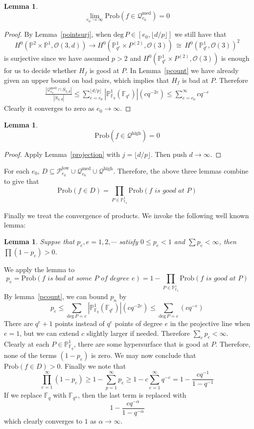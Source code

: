 \documentclass[12pt]{article}
\theoremstyle{plain}
\newtheorem{lemma}[equation]{Lemma}
\theoremstyle{definition}
\newcommand{\sP}{\mathcal{P}}
\newcommand{\IF}{\mathbb{F}}
\newcommand{\IP}{\mathbb{P}}
\newcommand{\sO}{\mathcal{O}}
\renewcommand{\deg}{\mathrm{deg}\,}
\newcommand\iso{{\, \cong \,}}
\newcommand{\<}{\langle}
\renewcommand{\>}{\rangle}
\newcommand{\fl}[1]{\lfloor #1 \rfloor}
\newcommand{\sQ}{\mathcal{Q}}
\newcommand{\Prob}{\mathrm{Prob}}
\begin{document}
\begin{lemma}
$$ \lim_{e_0 \to \infty} \Prob(f \in \sQ_{e_0}^{\mathrm{med}}) = 0 $$
\end{lemma}
\begin{proof}
By Lemma~\ref{pointsurj}, when $\deg P \in [e_0, \lfloor d/p \rfloor]$ we still have that 
$$ H^0(\IP^2 \times \IP^1, \sO(3, d)) \to H^0(\IP^1_{q^e} \times P^{(2)}, \sO(3)) \iso H^0(\IP^1_{q^e}, \sO(3))^2 $$ is surjective since we have assumed $p > 2$ and $H^0(\IP^1_{q^e} \times P^{(2)}, \sO(3))$ is enough for us to decide whether $H_f$ is good at $P$. In Lemma~\ref{pcount} we have already given an upper bound on bad pairs, which implies that $H_f$ is bad at $P$. Therefore 
\begin{align*}
\frac{|\sQ_{e_0}^{\mathrm{med}} \cap S_{3, d}|}{|S_{3, d}|} \le \sum_{e = e_0}^{\fl{d/p} }|\IP^1_{\IF_{q}}(\IF_{q^e})| (c q^{-2e}) \le \sum_{e = e_0}^{\infty}c q^{-e}
\end{align*}
Clearly it converges to zero as $e_0 \to \infty$. 
\end{proof}

\begin{lemma}
$$ \Prob(f \in \sQ^{\mathrm{high}}) = 0 $$
\end{lemma}
\begin{proof}
Apply Lemma~\ref{projection} with $j = \fl{d/p}$. Then push $d \to \infty$. 
\end{proof}

For each $e_0$, $D \subseteq \sP_{e_0}^{\mathrm{low}} \cup \sQ_{e_0}^{\mathrm{med}} \cup \sQ^{\mathrm{high}}$. Therefore, the above three lemmas combine to give that 
$$ \Prob(f \in D) = \prod_{P \in \IP^1_{\IF_q}} \Prob(f \textit{ is good at }P) $$

Finally we treat the convergence of products. We invoke the following well known lemma:
\begin{lemma}
Suppse that $p_e, e = 1, 2, \cdots$ satisfy $0 \le p_e < 1$ and $\sum p_e < \infty$, then $\prod (1 - p_e) > 0$. 
\end{lemma}

We apply the lemma to $$p_e = \Prob(f \textit{ is bad at some } P \textit{ of degree }e) = 1 - \prod_{P \in \IP^1_{\IF_q}} \Prob(f \textit{ is good at }P)$$ By lemma~\ref{pcount}, we can bound $p_n$ by 
$$ p_e  \le \sum_{\deg P = e} |\IP^1_{\IF_{q}}(\IF_{q^e})| (c q^{-2e}) \le \sum_{\deg P = e}  (c q^{-e}) $$
There are $q^e + 1$ points instead of $q^e$ points of degree $e$ in the projective line when $e = 1$, but we can extend $c$ slightly larger if needed. 
Therefore $\sum_e p_e < \infty$. Clearly at each $P \in \IP^1_{\IF_q}$, there are some hypersurface that is good at $P$. Therefore, none of the terms $(1 - p_e)$ is zero. We may now conclude that $\Prob(f \in D) > 0$. Finally we note that 
$$ \prod_{e=1}^\infty (1 - p_e) \ge 1 - \sum_{p = 1}^\infty p_e \ge 1 - c \sum_{e = 1}^\infty q^{-e} = 1 - \frac{cq^{-1}}{1 - q^{-1}}$$
If we replace $\IF_q$ with $\IF_{q^\alpha}$, then the last term is replaced with 
$$ 1 - \frac{cq^{-\alpha}}{1 - q^{-\alpha}} $$
which clearly converges to $1$ as $\alpha \to \infty$. 
\end{document}
